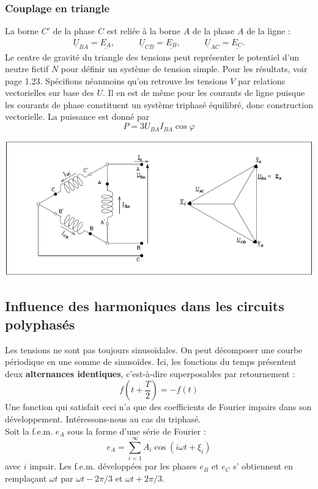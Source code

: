 \subsubsection{Couplage en triangle}
La borne $C'$ de la phase $C$ est reliée à la borne $A$ de la phase 
$A$ de la ligne :
\begin{equation}
	\begin{array}{ccc}
		\underline{U}_{BA} = \underline{E_A},\quad & \quad \underline{U}_{CB} =                  
		\underline{E_B}, \quad                     & \quad \underline{U}_{AC} = \underline{E_C}. 
	\end{array}		
\end{equation}
Le centre de gravité du triangle des tensions peut représenter le 
potentiel d'un neutre fictif $N$ pour définir un système de tension 
simple. Pour les résultats, voir page 1.23. Spécifions néanmoins qu'on retrouve les tensions $V$ par relations vectorielles sur base des $U$. Il en est de même pour les courants de ligne puisque les courants de phase constituent un système triphasé équilibré, donc construction vectorielle. La puissance est donné par 
\begin{equation}
	P = 3 U_{BA} I_{BA} \cos \varphi
\end{equation}
\begin{center}
	\includegraphics[scale=0.4]{ch1/image10.png}
\end{center}		
		
		
\subsection{Influence des harmoniques dans les circuits polyphasés}
Les tensions ne sont pas toujours sinusoïdales. On peut décomposer une courbe 
périodique en une somme de sinusoïdes. Ici, les fonctions du temps 
présentent deux \textbf{alternances identiques}, c'est-à-dire superposables par 
retournement :
\begin{equation}
	f(t+\frac{T}{2}) = -f(t)
\end{equation}
Une fonction qui satisfait ceci n'a que des coefficients de Fourier impairs 
dans son développement. Intéressons-nous au cas du triphasé. \\
Soit la f.e.m. $e_A$ sous la forme d'une série de Fourier :
\begin{equation}
	e_A = \sum_{i=1}^\infty A_i\cos(i\omega t + \xi_i)
\end{equation}
avec $i$ impair. Les f.e.m. développées par les phases $e_B$ et $e_C$ s'
obtiennent en remplaçant $\omega t$ par $\omega t - 2\pi/3$ et $\omega t 
+2\pi/3$.\\

